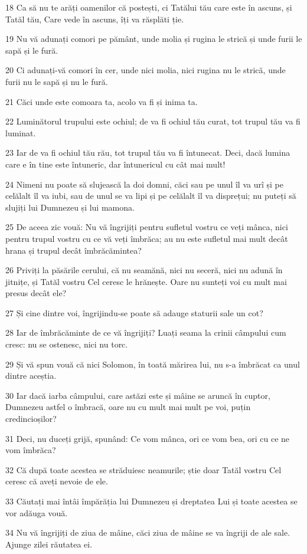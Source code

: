 \par 18 Ca să nu te arăți oamenilor că postești, ci Tatălui tău care este în ascuns, și Tatăl tău, Care vede în ascuns, îți va răsplăti ție.
\par 19 Nu vă adunați comori pe pământ, unde molia și rugina le strică și unde furii le sapă și le fură.
\par 20 Ci adunați-vă comori în cer, unde nici molia, nici rugina nu le strică, unde furii nu le sapă și nu le fură.
\par 21 Căci unde este comoara ta, acolo va fi și inima ta.
\par 22 Luminătorul trupului este ochiul; de va fi ochiul tău curat, tot trupul tău va fi luminat.
\par 23 Iar de va fi ochiul tău rău, tot trupul tău va fi întunecat. Deci, dacă lumina care e în tine este întuneric, dar întunericul cu cât mai mult!
\par 24 Nimeni nu poate să slujească la doi domni, căci sau pe unul îl va urî și pe celălalt îl va iubi, sau de unul se va lipi și pe celălalt îl va disprețui; nu puteți să slujiți lui Dumnezeu și lui mamona.
\par 25 De aceea zic vouă: Nu vă îngrijiți pentru sufletul vostru ce veți mânca, nici pentru trupul vostru cu ce vă veți îmbrăca; au nu este sufletul mai mult decât hrana și trupul decât îmbrăcămintea?
\par 26 Priviți la păsările cerului, că nu seamănă, nici nu seceră, nici nu adună în jitnițe, și Tatăl vostru Cel ceresc le hrănește. Oare nu sunteți voi cu mult mai presus decât ele?
\par 27 Și cine dintre voi, îngrijindu-se poate să adauge staturii sale un cot?
\par 28 Iar de îmbrăcăminte de ce vă îngrijiți? Luați seama la crinii câmpului cum cresc: nu se ostenesc, nici nu torc.
\par 29 Și vă spun vouă că nici Solomon, în toată mărirea lui, nu s-a îmbrăcat ca unul dintre aceștia.
\par 30 Iar dacă iarba câmpului, care astăzi este și mâine se aruncă în cuptor, Dumnezeu astfel o îmbracă, oare nu cu mult mai mult pe voi, puțin credincioșilor?
\par 31 Deci, nu duceți grijă, spunând: Ce vom mânca, ori ce vom bea, ori cu ce ne vom îmbrăca?
\par 32 Că după toate acestea se străduiesc neamurile; știe doar Tatăl vostru Cel ceresc că aveți nevoie de ele.
\par 33 Căutați mai întâi împărăția lui Dumnezeu și dreptatea Lui și toate acestea se vor adăuga vouă.
\par 34 Nu vă îngrijiți de ziua de mâine, căci ziua de mâine se va îngriji de ale sale. Ajunge zilei răutatea ei.


